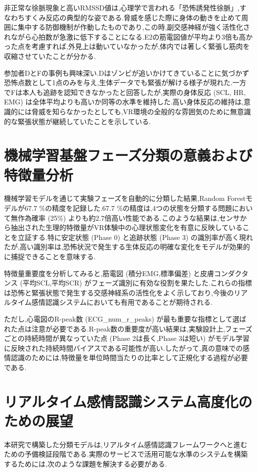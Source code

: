 \documentclass[book,paper=a4,fontsize=10pt,jafontscale=0.92]{jlreq}
\begin{document}
非正常な徐脈現象と高いRMSSD値は,心理学で言われる「恐怖誘発性徐脈」,すなわちすくみ反応の典型的な姿である.脅威を感じた際に身体の動きを止めて周囲に集中する防御機制が作動したものであり,この時,副交感神経が強く活性化されながら心拍数が急激に低下することになる.E2の筋電図値が平均より3倍も高かった点を考慮すれば,外見上は動いていなかったが,体内では著しく緊張し筋肉を収縮させていたことが分かる.

参加者DとFの事例も興味深い.Dはゾンビが追いかけてきていることに気づかず恐怖点数として1点のみを与え,生体データでも緊張が解ける様子が現れた.一方でFは本人も追跡を認知できなかったと回答したが,実際の身体反応 (SCL, HR, EMG) は全体平均よりも高いか同等の水準を維持した.高い身体反応の維持は,意識的には脅威を知らなかったとしても,VR環境の全般的な雰囲気のために無意識的な緊張状態が継続していたことを示している.

\section{機械学習基盤フェーズ分類の意義および特徴量分析}
機械学習モデルを通じて実験フェーズを自動的に分類した結果,Random Forestモデルが67.7 \%の精度を記録した.67.7 \%の精度は,4つの状態を分類する問題において無作為確率 (25\%) よりも約2.7倍高い性能である.このような結果は,センサから抽出された生理的特徴量がVR体験中の心理状態変化を有意に反映していることを立証する.特に安定状態 (Phase 0) と追跡状態 (Phase 3) の識別率が高く現れたが,高い識別率は,恐怖状況で発生する生体反応の明確な変化をモデルが効果的に捕捉できることを意味する.

特徴量重要度を分析してみると,筋電図 (積分EMG,標準偏差) と皮膚コンダクタンス (平均SCL,平均SCR) がフェーズ識別に有効な役割を果たした.これらの指標は恐怖と緊張状態で発生する交感神経系の活性化をよく示しており,今後のリアルタイム感情認識システムにおいても有用であることが期待される.

ただし,心電図のR-peak数 (ECG\_num\_r\_peaks) が最も重要な指標として選ばれた点は注意が必要である.R-peak数の重要度が高い結果は,実験設計上,フェーズごとの持続時間が異なっていた点 (Phase 2は長く,Phase 3は短い) がモデル学習に反映された持続時間バイアスである可能性が高い.したがって,真の意味での感情認識のためには,特徴量を単位時間当たりの比率として正規化する過程が必要である.

\section{リアルタイム感情認識システム高度化のための展望}
本研究で構築した分類モデルは,リアルタイム感情認識フレームワークへと進むための予備検証段階である.実際のサービスで活用可能な水準のシステムを構築するためには,次のような課題を解決する必要がある.
\end{document}
